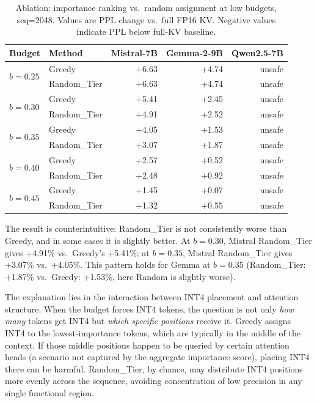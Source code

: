 \documentclass[11pt]{article}
\newcommand{\budget}{b}
\newcommand{\pct}{\%}
\theoremstyle{plain}
\theoremstyle{definition}
\begin{document}
\begin{table}[t]
\centering
\caption{Ablation: importance ranking vs.\ random assignment at low budgets, seq=2048.  Values are PPL change vs.\ full FP16 KV.  Negative values indicate PPL below full-KV baseline.}
\label{tab:ablation-ranking}
\small
\begin{tabular}{llrrr}
\toprule
Budget & Method & Mistral-7B & Gemma-2-9B & Qwen2.5-7B \\
\midrule
\multirow{2}{*}{$\budget=0.25$}
  & Greedy & +6.63 & +4.74 & unsafe \\
  & Random\_Tier & +6.63 & +4.74 & unsafe \\
\midrule
\multirow{2}{*}{$\budget=0.30$}
  & Greedy & +5.41 & +2.45 & unsafe \\
  & Random\_Tier & +4.91 & +2.52 & unsafe \\
\midrule
\multirow{2}{*}{$\budget=0.35$}
  & Greedy & +4.05 & +1.53 & unsafe \\
  & Random\_Tier & +3.07 & +1.87 & unsafe \\
\midrule
\multirow{2}{*}{$\budget=0.40$}
  & Greedy & +2.57 & +0.52 & unsafe \\
  & Random\_Tier & +2.48 & +0.92 & unsafe \\
\midrule
\multirow{2}{*}{$\budget=0.45$}
  & Greedy & +1.45 & +0.07 & unsafe \\
  & Random\_Tier & +1.32 & +0.55 & unsafe \\
\bottomrule
\end{tabular}
\end{table}

The result is counterintuitive: Random\_Tier is not consistently worse than Greedy, and in some cases it is slightly better.  At $\budget=0.30$, Mistral Random\_Tier gives +4.91\pct{} vs.\ Greedy's +5.41\pct{}; at $\budget=0.35$, Mistral Random\_Tier gives +3.07\pct{} vs.\ +4.05\pct{}.  This pattern holds for Gemma at $\budget=0.35$ (Random\_Tier: +1.87\pct{} vs.\ Greedy: +1.53\pct{}, here Random is slightly worse).

The explanation lies in the interaction between INT4 placement and attention structure.  When the budget forces INT4 tokens, the question is not only \emph{how many} tokens get INT4 but \emph{which specific positions} receive it.  Greedy assigns INT4 to the lowest-importance tokens, which are typically in the middle of the context.  If those middle positions happen to be queried by certain attention heads (a scenario not captured by the aggregate importance score), placing INT4 there can be harmful.  Random\_Tier, by chance, may distribute INT4 positions more evenly across the sequence, avoiding concentration of low precision in any single functional region.
\end{document}
